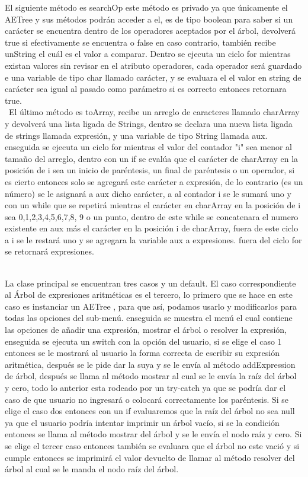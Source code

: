 \documentclass{report}
\begin{document}
El siguiente método es searchOp este método es privado ya que únicamente el AETree y sus métodos podrán acceder a el, es de tipo boolean para saber si un carácter se encuentra dentro de los operadores aceptados por el árbol, devolverá true si efectivamente se encuentra o false en caso contrario, también recibe unString el cuál es el valor a comparar. Dentro se ejecuta un ciclo for mientras existan valores sin revisar en el atributo operadores, cada operador será guardado e una variable de tipo char llamado carácter,  y se evaluara el el valor en string de carácter sea igual al pasado como parámetro si es correcto entonces retornara true.\\\
El último método es toArray, recibe un arreglo de  caracteres llamado charArray y devolverá una lista ligada de Strings, dentro se declara una nueva lista ligada de strings llamada expresión, y una variable de tipo String llamada aux. enseguida se ejecuta un ciclo for mientras el valor del contador "i" sea menor al tamaño del arreglo, dentro con un if se evalúa que el carácter de charArray en la posición de i sea un inicio de paréntesis, un final de paréntesis o un operador, si es cierto entonces solo se agregará este carácter a expresión, de lo contrario (es un número) se le asignará a aux dicho carácter, a al contador i se le sumará uno y con un while que se repetirá mientras el carácter en charArray en la posición de i sea 0,1,2,3,4,5,6,7,8, 9 o un punto, dentro de este while se concatenara el numero existente en aux más el carácter en la posición i de charArray, fuera de este ciclo a i se le restará uno y se agregara la variable aux a expresiones. fuera del ciclo for se retornará expresiones.\\\

La clase principal se encuentran tres casos y un default. El caso correspondiente al Árbol de expresiones aritméticas es el tercero, lo primero que se hace en este caso es instanciar un AETree , para que así, podamos usarlo y modificarlos para todas las opciones del sub-menú. enseguida se muestra el menú el cual contiene  las opciones de añadir una expresión, mostrar el árbol o resolver la expresión, enseguida se ejecuta un switch con la opción del usuario, si se elige el caso 1 entonces se le mostrará al usuario la forma correcta de escribir su expresión aritmética, después se le pide dar la suya y se le envía al método addExpression de árbol, después se llama al método mostrar al cual se le envía la raíz del árbol y cero, todo lo anterior esta rodeado por un try-catch ya que se podría dar el caso de que usuario no ingresará o colocará correctamente los paréntesis. Si se elige el caso dos entonces con un if evaluaremos que la raíz del árbol no sea null ya que el usuario podría intentar imprimir un árbol vacío, si se la condición  entonces se llama al método mostrar del árbol y se le envía el nodo raíz y cero.  Si se elige el tercer caso entonces también se evaluara que el árbol no este vació y si cumple entonces se imprimirá el valor devuelto de llamar al método resolver del árbol al cual se le manda el nodo raíz del árbol.
\end{document}
